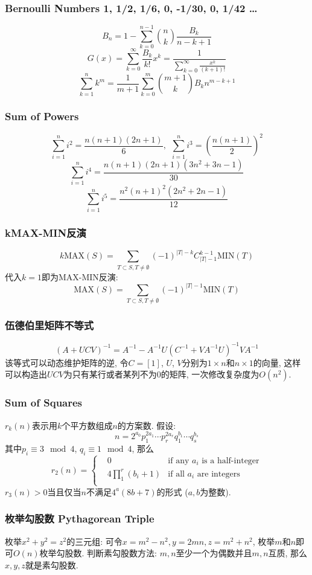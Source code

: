 \begin{small}
\subsubsection{Bernoulli Numbers 1, 1/2, 1/6, 0, -1/30, 0, 1/42 \dots}
\[ B_n = 1 - \sum_{k=0}^{n-1}{n \choose k}\frac{B_k}{n-k+1} \]
\[ G(x) = \sum_{k=0}^{\infty}\frac{B_k}{k!}x^k
= \frac{1}{\sum_{k=0}^{\infty}\frac{x^k}{(k+1)!}} \]
\[ \sum_{k=1}^nk^m = \frac{1}{m+1}\sum_{k=0}^m{m+1 \choose k}B_kn^{m-k+1} \]
\subsubsection{Sum of Powers}
\[\sum_{i=1}^ni^2=\frac{n(n+1)(2n+1)}{6},\ \ \sum_{i=1}^ni^3=(\frac{n(n+1)}{2})^2\]
\[\sum_{i=1}^ni^4=\frac{n(n+1)(2n+1)(3n^2+3n-1)}{30}\]
\[\sum_{i=1}^ni^5=\frac{n^2(n+1)^2(2n^2+2n-1)}{12}\]
\subsubsection{kMAX-MIN反演}
\[k \mathrm{MAX}(S)=\sum_{T\subset S, T\neq \emptyset}(-1)^{|T|-k}C_{|T|-1}^{k-1}\mathrm{MIN}(T)\]
代入$k=1$即为MAX-MIN反演:
\[\mathrm{MAX}(S)=\sum_{T\subset S, T\neq \emptyset}(-1)^{|T|-1}\mathrm{MIN}(T)\]
\subsubsection{伍德伯里矩阵不等式}
$$(A+UCV)^{-1}=A^{-1}-A^{-1}U(C^{-1}+VA^{-1}U)^{-1}VA^{-1}$$
该等式可以动态维护矩阵的逆, 令$C=[1]$, $U$, $V$分别为$1\times n$和$n\times 1$的向量, 这样可以构造出$UCV$为只有某行或者某列不为0的矩阵, 一次修改复杂度为$O(n^2)$.
\subsubsection{Sum of Squares}
$r_k(n)$表示用$k$个平方数组成$n$的方案数. 假设: 
\[n=2^{a_0}p_1^{2a_1}\cdots p_r^{2a_r}q_1^{b_1}\cdots q_s^{b_s}\]
其中$p_i\equiv 3 \mod 4$, $q_i\equiv 1 \mod 4$, 那么
\[r_2(n)=\left\{\begin{aligned}
& 0 & \text{if any }a_i\text{ is a half-integer}\\
& 4\prod_1^r(b_i+1) & \text{if all }a_i\text{ are integers}\\
\end{aligned}\right.\]
$r_3(n)>0$当且仅当$n$不满足$4^a(8b+7)$的形式 ($a,b$为整数).
\subsubsection{枚举勾股数 Pythagorean Triple}
枚举$x^2+y^2=z^2$的三元组: 可令$x=m^2-n^2,y=2mn,z=m^2+n^2$, 枚举$m$和$n$即可$O(n)$枚举勾股数. 判断素勾股数方法: $m,n$至少一个为偶数并且$m,n$互质, 那么$x,y,z$就是素勾股数.

\end{small}
